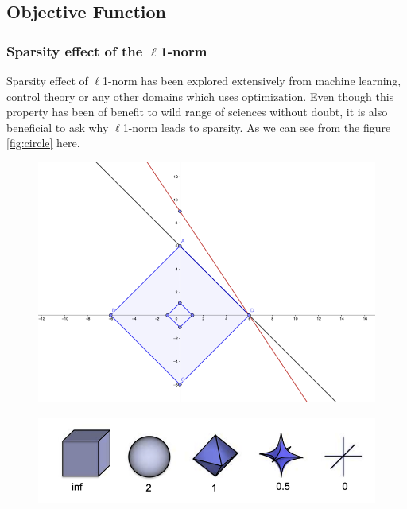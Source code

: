 \documentclass[a4paper,10pt]{article}
\begin{document}
\subsection{Objective Function}\label{objective}

\subsubsection{Sparsity effect of the $\ell$1-norm}\label{norm}
Sparsity effect of $\ell$1-norm has been explored extensively from machine learning, control theory or any other domains which uses optimization. Even though this property has been of benefit to wild range of sciences without doubt, it is also beneficial to ask why $\ell$1-norm leads to sparsity. As we can see from the figure \ref{fig:circle} here. 
	\begin{figure}[ht!]
		\centering
		\begin{minipage}[t]{.45\textwidth}
			  \centering
			  \includegraphics[width=\linewidth]{figures/circle}
			  \label{fig:circle}
		\end{minipage}%
		\begin{minipage}[t]{.55\textwidth}
			  \centering
			  \includegraphics[width=\linewidth]{figures/norms}
			  \label{fig:norms}
		\end{minipage}
	\end{figure}
\end{document}
